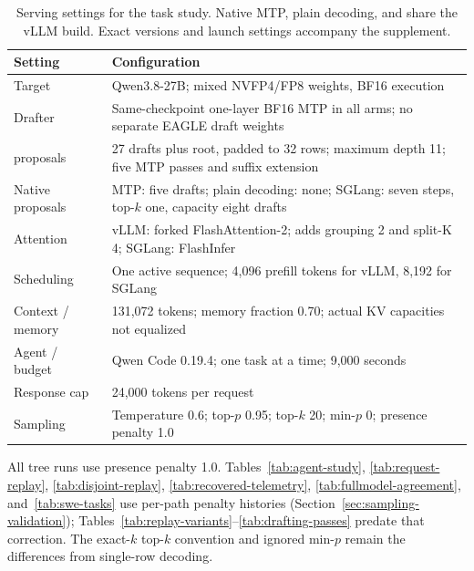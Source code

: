 \begin{table}[!htbp]
\caption{Serving settings for the task study. Native MTP, plain decoding, and \sys{} share the vLLM build. Exact versions and launch settings accompany the supplement.}
\label{tab:serving-config}
\centering\footnotesize
\renewcommand{\arraystretch}{1.12}
\begin{tabularx}{\columnwidth}{@{}>{\raggedright\arraybackslash}p{}Y@{}}
\toprule
Setting & Configuration \\
\midrule
Target & Qwen3.8-27B; mixed NVFP4/FP8 weights, BF16 execution \\
Drafter & Same-checkpoint one-layer BF16 MTP in all arms; no separate EAGLE draft weights \\
\sys{} proposals & 27 drafts plus root, padded to 32 rows; maximum depth 11; five MTP passes and suffix extension \\
Native proposals & MTP: five drafts; plain decoding: none; SGLang: seven steps, top-$k$ one, capacity eight drafts \\
Attention & vLLM: forked FlashAttention-2; \sys{} adds grouping 2 and split-K 4; SGLang: FlashInfer \\
Scheduling & One active sequence; 4,096 prefill tokens for vLLM, 8,192 for SGLang \\
Context / memory & 131,072 tokens; memory fraction 0.70; actual KV capacities not equalized \\
Agent / budget & Qwen Code 0.19.4; one task at a time; 9,000 seconds \\
Response cap & 24,000 tokens per request \\
Sampling & Temperature 0.6; top-$p$ 0.95; top-$k$ 20; min-$p$ 0; presence penalty 1.0 \\
\bottomrule
\end{tabularx}
\end{table}

All tree runs use presence penalty 1.0. Tables~\ref{tab:agent-study}, \ref{tab:request-replay}, \ref{tab:disjoint-replay}, \ref{tab:recovered-telemetry}, \ref{tab:fullmodel-agreement}, and~\ref{tab:swe-tasks} use per-path penalty histories (Section~\ref{sec:sampling-validation}); Tables~\ref{tab:replay-variants}--\ref{tab:drafting-passes} predate that correction. The exact-$k$ top-$k$ convention and ignored min-$p$ remain the differences from single-row decoding.
